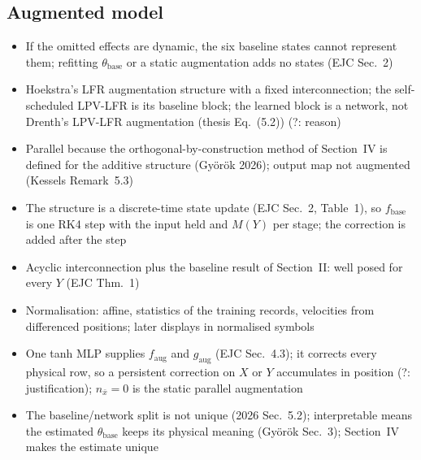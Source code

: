 \subsection{Augmented model}\label{sec:aug_structure}
\ifdraft
\begin{itemize}
\item If the omitted effects are dynamic, the six baseline states cannot represent them; refitting $\theta_{\mathrm{base}}$ or a static augmentation adds no states (EJC Sec.~2)
\item Hoekstra's LFR augmentation structure with a fixed interconnection; the self-scheduled LPV-LFR is its baseline block; the learned block is a network, not Drenth's LPV-LFR augmentation (thesis Eq.~(5.2)) (?: reason)
\item Parallel because the orthogonal-by-construction method of Section~IV is defined for the additive structure (Gy\"or\"ok 2026); output map not augmented (Kessels Remark~5.3)
\item The structure is a discrete-time state update (EJC Sec.~2, Table~1), so $f_{\mathrm{base}}$ is one RK4 step with the input held and $M(Y)$ per stage; the correction is added after the step
\item Acyclic interconnection plus the baseline result of Section~II: well posed for every $Y$ (EJC Thm.~1)
\item Normalisation: affine, statistics of the training records, velocities from differenced positions; later displays in normalised symbols
\item One tanh MLP supplies $f_{\mathrm{aug}}$ and $g_{\mathrm{aug}}$ (EJC Sec.~4.3); it corrects every physical row, so a persistent correction on $X$ or $Y$ accumulates in position (?: justification); $n_{\bar x}=0$ is the static parallel augmentation
\item The baseline/network split is not unique (2026 Sec.~5.2); interpretable means the estimated $\theta_{\mathrm{base}}$ keeps its physical meaning (Gy\"or\"ok Sec.~3); Section~IV makes the estimate unique
\end{itemize}
\fi
%
